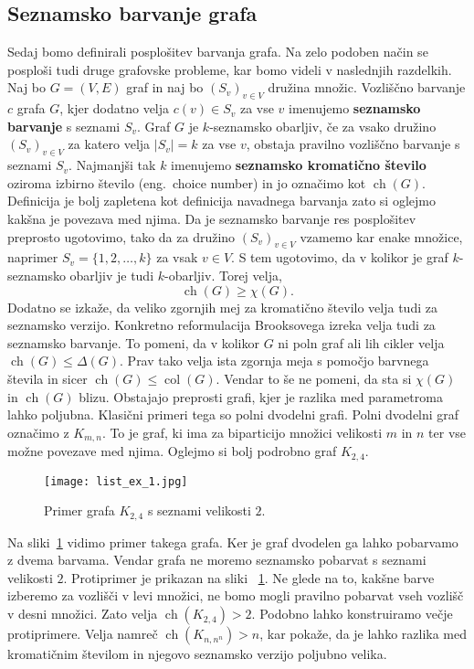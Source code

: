 \documentclass[12pt,a4paper,twoside]{article}
\theoremstyle{definition} %
\theoremstyle{plain} %
\numberwithin{equation}{section}  %
\DeclareMathOperator{\col}{col}
\DeclareMathOperator{\ch}{ch}
\begin{document}
\subsection{Seznamsko barvanje grafa}
Sedaj bomo definirali posplošitev barvanja grafa. Na zelo podoben način se posploši tudi druge grafovske probleme, kar bomo videli v naslednjih razdelkih. Naj bo $G = (V, E)$ graf in naj bo $(S_v)_{v \in V}$ družina množic. Vozliščno barvanje $c$ grafa $G$, kjer dodatno velja $c(v) \in S_v$ za vse $v$ imenujemo \textbf{seznamsko barvanje} s seznami $S_v$. Graf $G$ je $k$-seznamsko obarljiv, če za vsako družino  $(S_v)_{v \in V}$ za katero velja $|S_v| = k$ za vse $v$, obstaja pravilno vozliščno barvanje s seznami $S_v$. Najmanjši tak $k$ imenujemo \textbf{seznamsko kromatično število} oziroma izbirno število (eng.\ choice number) in jo označimo kot $\ch(G)$.
Definicija je bolj zapletena kot definicija navadnega barvanja zato si oglejmo kakšna je povezava med njima. Da je seznamsko barvanje res posplošitev preprosto ugotovimo, tako da za družino  $(S_v)_{v \in V}$ vzamemo kar enake množice, naprimer $S_v = \{1,2, \ldots, k\}$ za vsak $v \in V$.  S tem ugotovimo, da v kolikor je graf $k$-seznamsko obarljiv je tudi $k$-obarljiv. Torej velja, 
$$ \ch(G) \ge \chi(G).$$
Dodatno se izkaže, da veliko zgornjih mej za kromatično število velja tudi za seznamsko verzijo. Konkretno reformulacija Brooksovega izreka velja tudi za seznamsko barvanje. To pomeni, da v kolikor $G$ ni poln graf ali lih cikler velja $\ch(G) \le \Delta(G)$.  Prav tako velja ista zgornja meja s pomočjo barvnega števila in sicer $\ch(G) \le \col(G)$. Vendar to še ne pomeni, da sta si $\chi(G)$ in $\ch(G)$ blizu. Obstajajo preprosti grafi, kjer je razlika med parametroma lahko poljubna. Klasični primeri tega so polni dvodelni grafi. Polni dvodelni graf označimo z $K_{m,n}$. To je graf, ki ima za biparticijo množici velikosti $m$ in $n$ ter vse možne povezave med njima. Oglejmo si bolj podrobno graf $K_{2, 4}$.

 \begin{figure}[h!]
\caption{Primer grafa $K_{2, 4}$ s seznami velikosti $2$.}
\label{list_ex_1}
\centering
    \texttt{[image: list\_ex\_1.jpg]}
    \end{figure}
Na sliki~\ref{list_ex_1} vidimo primer takega grafa. Ker je graf dvodelen ga lahko pobarvamo z dvema barvama. Vendar grafa ne moremo seznamsko pobarvat s seznami velikosti $2$. Protiprimer je prikazan na sliki ~\ref{list_ex_1}. Ne glede na to, kakšne barve izberemo za vozlišči v levi množici, ne bomo mogli pravilno pobarvat vseh vozlišč v desni množici. Zato velja $\ch(K_{2, 4}) > 2$. Podobno lahko konstruiramo večje protiprimere. Velja namreč $\ch(K_{n, n^n}) > n$, kar pokaže, da je lahko razlika med kromatičnim številom in njegovo seznamsko verzijo poljubno velika.
\end{document}
